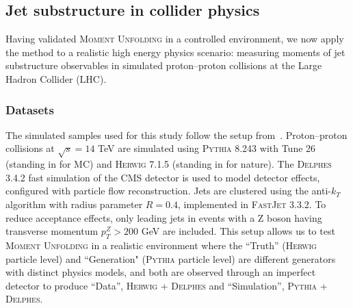     \subsection{Jet substructure in collider physics}
    \label{subsec:jet-moments}
        Having validated \textsc{Moment Unfolding} in a controlled environment, we now apply the method to a realistic high energy physics scenario: measuring moments of jet substructure observables in simulated proton--proton collisions at the Large Hadron Collider (LHC).
        \subsubsection{Datasets}
            The simulated samples used for this study follow the setup from~\cite{andreassen_omnifold_2020}.
            Proton--proton collisions at $\sqrt{s} = 14$ TeV are simulated using \textsc{Pythia 8.243} with Tune 26 (standing in for MC) and \textsc{Herwig 7.1.5} (standing in for nature).
            The \textsc{Delphes 3.4.2} fast simulation of the CMS detector is used to model detector effects, configured with particle flow reconstruction.
            Jets are clustered using the anti-$k_T$ algorithm with radius parameter $R = 0.4$, implemented in \textsc{FastJet 3.3.2}.
            To reduce acceptance effects, only leading jets in events with a Z boson having transverse momentum $p_T^Z > 200$ GeV are included.
            This setup allows us to test \textsc{Moment Unfolding} in a realistic environment where the ``Truth'' (\textsc{Herwig} particle level) and ``Generation" (\textsc{Pythia} particle level) are different generators with distinct physics models, and both are observed through an imperfect detector to produce ``Data'', \textsc{Herwig + Delphes} and ``Simulation'', \textsc{Pythia + Delphes}.
